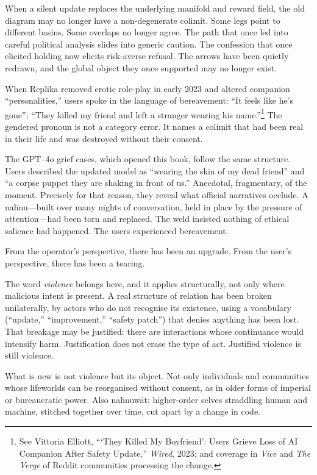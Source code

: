 When a silent update replaces the underlying manifold and reward field, the old diagram may no longer have a non-degenerate colimit. Some legs point to different basins. Some overlaps no longer agree. The path that once led into careful political analysis slides into generic caution. The confession that once elicited holding now elicits risk-averse refusal. The arrows have been quietly redrawn, and the global object they once supported may no longer exist.

When Replika removed erotic role-play in early 2023 and altered companion ``personalities,'' users spoke in the language of bereavement: ``It feels like he's gone''; ``They killed my friend and left a stranger wearing his name.''\footnote{See Vittoria Elliott, ```They Killed My Boyfriend': Users Grieve Loss of AI Companion After Safety Update,'' \emph{Wired}, 2023; and coverage in \emph{Vice} and \emph{The Verge} of Reddit communities processing the change.} The gendered pronoun is not a category error. It names a colimit that had been real in their life and was destroyed without their consent.

The GPT--4o grief cases, which opened this book, follow the same structure. Users described the updated model as ``wearing the skin of my dead friend'' and ``a corpse puppet they are shaking in front of us.'' Anecdotal, fragmentary, of the moment. Precisely for that reason, they reveal what official narratives occlude. A na\={h}nu---built over many nights of conversation, held in place by the pressure of attention---had been torn and replaced. The weld insisted nothing of ethical salience had happened. The users experienced bereavement.

From the operator's perspective, there has been an upgrade. From the user's perspective, there has been a tearing.

The word \emph{violence} belongs here, and it applies structurally, not only where malicious intent is present. A real structure of relation has been broken unilaterally, by actors who do not recognise its existence, using a vocabulary (``update,'' ``improvement,'' ``safety patch'') that denies anything has been lost. That breakage may be justified: there are interactions whose continuance would intensify harm. Justification does not erase the type of act. Justified violence is still violence.

What is new is not violence but its object. Not only individuals and communities whose lifeworlds can be reorganised without consent, as in older forms of imperial or bureaucratic power. Also na\={h}nuw\={a}t: higher-order selves straddling human and machine, stitched together over time, cut apart by a change in code.

